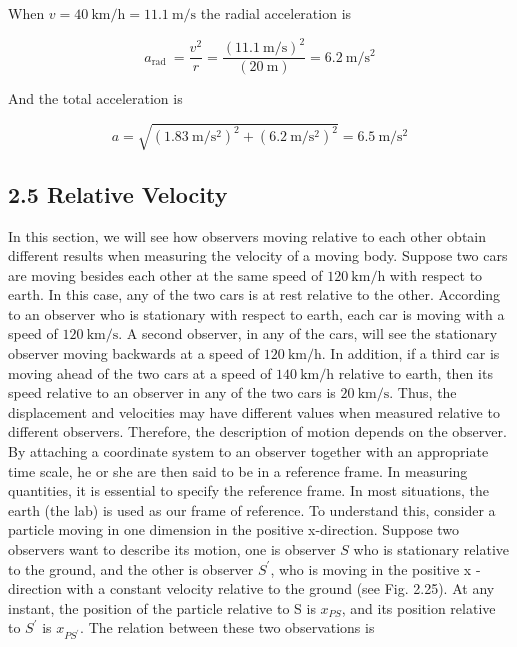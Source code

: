 \documentclass[10pt]{article}
\begin{document}
When $v=40 \mathrm{~km} / \mathrm{h}=11.1 \mathrm{~m} / \mathrm{s}$ the radial acceleration is

$$
a_{\text {rad }}=\frac{v^{2}}{r}=\frac{(11.1 \mathrm{~m} / \mathrm{s})^{2}}{(20 \mathrm{~m})}=6.2 \mathrm{~m} / \mathrm{s}^{2}
$$

And the total acceleration is

$$
a=\sqrt{\left(1.83 \mathrm{~m} / \mathrm{s}^{2}\right)^{2}+\left(6.2 \mathrm{~m} / \mathrm{s}^{2}\right)^{2}}=6.5 \mathrm{~m} / \mathrm{s}^{2}
$$

\subsection*{2.5 Relative Velocity}
In this section, we will see how observers moving relative to each other obtain different results when measuring the velocity of a moving body. Suppose two cars are moving besides each other at the same speed of $120 \mathrm{~km} / \mathrm{h}$ with respect to earth. In this case, any of the two cars is at rest relative to the other. According to an observer who is stationary with respect to earth, each car is moving with a speed of $120 \mathrm{~km} / \mathrm{s}$. A second observer, in any of the cars, will see the stationary observer moving backwards at a speed of $120 \mathrm{~km} / \mathrm{h}$. In addition, if a third car is moving ahead of the two cars at a speed of $140 \mathrm{~km} / \mathrm{h}$ relative to earth, then its speed relative to an observer in any of the two cars is $20 \mathrm{~km} / \mathrm{s}$. Thus, the displacement and velocities may have different values when measured relative to different observers. Therefore, the description of motion depends on the observer. By attaching a coordinate system to an observer together with an appropriate time scale, he or she are then said to be in a reference frame. In measuring quantities, it is essential to specify the reference frame. In most situations, the earth (the lab) is used as our frame of reference. To understand this, consider a particle moving in one dimension in the positive x-direction. Suppose two observers want to describe its motion, one is observer $S$ who is stationary relative to the ground, and the other is observer $S^{\prime}$, who is moving in the positive x -direction with a constant velocity relative to the ground (see Fig. 2.25). At any instant, the position of the particle relative to S is $x_{P S}$, and its position relative to $S^{\prime}$ is $x_{P S^{\prime}}$. The relation between these two observations is
\end{document}
